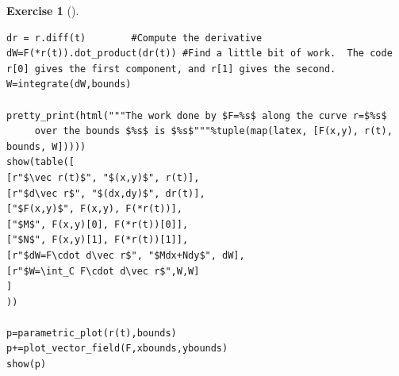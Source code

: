 \documentclass[10pt,]{book}
\theoremstyle{plain}
\theoremstyle{definition}
\theoremstyle{definition}
\theoremstyle{definition}
\theoremstyle{definition}
\newtheorem{exploration}[project]{Exercise}
\theoremstyle{definition}
\numberwithin{equation}{section}
\begin{document}
\begin{exploration}[]
\begin{lstlisting}[style=sageinput]
dr = r.diff(t)        #Compute the derivative
dW=F(*r(t)).dot_product(dr(t)) #Find a little bit of work.  The code r[0] gives the first component, and r[1] gives the second. 
W=integrate(dW,bounds)

pretty_print(html("""The work done by $F=%s$ along the curve r=$%s$ 
     over the bounds $%s$ is $%s$"""%tuple(map(latex, [F(x,y), r(t), bounds, W]))))
show(table([
[r"$\vec r(t)$", "$(x,y)$", r(t)],
[r"$d\vec r$", "$(dx,dy)$", dr(t)],
["$F(x,y)$", F(x,y), F(*r(t))],
["$M$", F(x,y)[0], F(*r(t))[0]],
["$N$", F(x,y)[1], F(*r(t))[1]],
[r"$dW=F\cdot d\vec r$", "$Mdx+Ndy$", dW],
[r"$W=\int_C F\cdot d\vec r$",W,W]
]
))

p=parametric_plot(r(t),bounds)
p+=plot_vector_field(F,xbounds,ybounds)
show(p)
\end{lstlisting}
\end{exploration}
\end{document}
